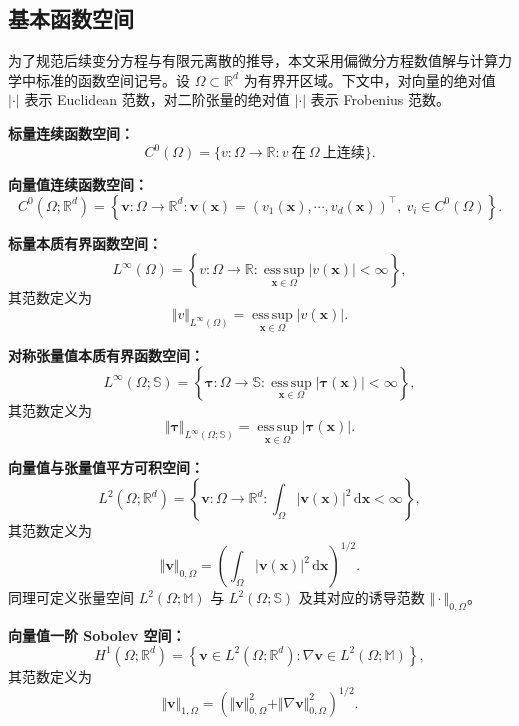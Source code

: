 \subsection{基本函数空间}
\label{subsec:function_spaces}

为了规范后续变分方程与有限元离散的推导，本文采用偏微分方程数值解与计算力学中标准的函数空间记号。设 $\Omega\subset\mathbb{R}^d$ 为有界开区域。下文中，对向量的绝对值 $\vert\cdot\vert$ 表示 Euclidean 范数，对二阶张量的绝对值 $\vert\cdot\vert$ 表示 Frobenius 范数。

\par\medskip
\noindent\textbf{标量连续函数空间：}
\[
C^0(\Omega)
=
\{v:\Omega\to\mathbb{R} : v~\text{在}~\Omega~\text{上连续}\}.
\]

\noindent\textbf{向量值连续函数空间：}
\[
C^0(\Omega;\mathbb{R}^d)
=
\left\{
\boldsymbol{v}:\Omega\to\mathbb{R}^d :
\boldsymbol{v}(\boldsymbol{x})
=
(v_1(\boldsymbol{x}),\cdots,v_d(\boldsymbol{x}))^{\top},
\ v_i\in C^0(\Omega)
\right\}.
\]

\noindent\textbf{标量本质有界函数空间：}
\[
L^{\infty}(\Omega)
=
\left\{
v:\Omega\to\mathbb{R} :
\operatorname*{ess\,sup}_{\boldsymbol{x}\in\Omega}
|v(\boldsymbol{x})| < \infty
\right\},
\]
\noindent 其范数定义为
\[
\Vert v\Vert_{L^\infty(\Omega)}
=
\operatorname*{ess\,sup}_{\boldsymbol{x}\in\Omega}
|v(\boldsymbol{x})|.
\]

\noindent\textbf{对称张量值本质有界函数空间：}
\[
L^{\infty}(\Omega;\mathbb{S})
=
\left\{
\boldsymbol{\tau}:\Omega\to\mathbb{S} :
\operatorname*{ess\,sup}_{\boldsymbol{x}\in\Omega}
|\boldsymbol{\tau}(\boldsymbol{x})| < \infty
\right\},
\]
\noindent 其范数定义为
\[
\Vert\boldsymbol{\tau}\Vert_{L^\infty(\Omega;\mathbb{S})}
=
\operatorname*{ess\,sup}_{\boldsymbol{x}\in\Omega}
|\boldsymbol{\tau}(\boldsymbol{x})|.
\]

\noindent\textbf{向量值与张量值平方可积空间：}
\[
L^2(\Omega;\mathbb{R}^d)
=
\left\{
\boldsymbol{v}:\Omega\to\mathbb{R}^d :
\int_{\Omega} |\boldsymbol{v}(\boldsymbol{x})|^2
\,\mathrm{d}\boldsymbol{x} < \infty
\right\},
\]
\noindent 其范数定义为
\[
\Vert\boldsymbol{v}\Vert_{0,\Omega}
=
\left(
\int_{\Omega}
|\boldsymbol{v}(\boldsymbol{x})|^2
\,\mathrm{d}\boldsymbol{x}
\right)^{1/2}.
\]
\noindent 同理可定义张量空间 $L^2(\Omega;\mathbb{M})$ 与 $L^2(\Omega;\mathbb{S})$ 及其对应的诱导范数 $\Vert\cdot\Vert_{0,\Omega}$。

\par\medskip
\noindent\textbf{向量值一阶 Sobolev 空间：}
\[
H^1(\Omega;\mathbb{R}^d)
=
\left\{
\boldsymbol{v}\in L^2(\Omega;\mathbb{R}^d) :
\nabla\boldsymbol{v}\in L^2(\Omega;\mathbb{M})
\right\},
\]
\noindent 其范数定义为
\[
\Vert\boldsymbol{v}\Vert_{1,\Omega}
=
\left(
\Vert\boldsymbol{v}\Vert^2_{0,\Omega}
+
\Vert\nabla\boldsymbol{v}\Vert^2_{0,\Omega}
\right)^{1/2}.
\]

